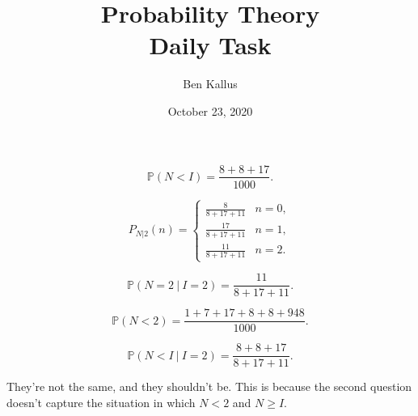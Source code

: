 \documentclass[12pt]{article}
\title{Probability Theory \\ Daily Task}
\author{Ben Kallus}
\date{October 23, 2020}
\begin{document}
\maketitle

 $$\mathbb P(N < I) = \frac{8 + 8 + 17}{1000}.$$

 $$P_{N|2}(n) = \begin{cases} \frac{8}{8 + 17 + 11} & n = 0, \\ \frac{17}{8 + 17 + 11} & n = 1, \\ \frac{11}{8+17+11} & n = 2. \end{cases}$$

 $$\mathbb P(N=2~|~I=2) = \frac{11}{8+17+11}.$$

 $$\mathbb P(N < 2) = \frac{1+7+17+8+8+948}{1000}.$$

 $$\mathbb P(N<I~|~I=2) = \frac{8+8+17}{8+17+11}.$$

 They're not the same, and they shouldn't be. This is because the second question doesn't capture the situation in which $N < 2$ and $N \geq I$.
\end{document}
